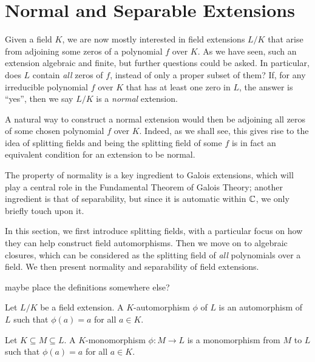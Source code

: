 \section{Normal and Separable Extensions}

Given a field $K$, we are now mostly interested in field extensions $L/K$ that arise from adjoining some zeros of a polynomial $f$ over $K$. As we have seen, such an extension algebraic and finite, but further questions could be asked. In particular, does $L$ contain \textit{all} zeros of $f$, instead of only a proper subset of them? If,  for any irreducible polynomial $f$ over $K$ that has at least one zero in $L$, the answer is ``yes'', then we say $L/K$ is a \textit{normal} extension. 

A natural way to construct a normal extension would then be adjoining all zeros of some chosen polynomial $f$ over $K$. Indeed, as we shall see, this gives rise to the idea of splitting fields and being the splitting field of some $f$ is in fact an equivalent condition for an extension to be normal. 

The property of normality is a key ingredient to Galois extensions, which will play a central role in the Fundamental Theorem of Galois Theory; another ingredient is that of separability, but since it is automatic within $\mathbb C$, we only briefly touch upon it. 

In this section, we first introduce splitting fields, with a particular focus on how they can help construct field automorphisms. Then we move on to algebraic closures, which can be considered as the splitting field of \textit{all} polynomials over a field. We then present normality and separability of field extensions. 



\TODO maybe place the definitions somewhere else?
\begin{definition} \label{def:automorphism}
	Let $L/K$ be a field extension. A $K$-automorphism $\phi$ of $L$ is an automorphism of $L$ such that $\phi(a) = a$ for all $a \in K$. 
\end{definition}

\begin{definition}
	Let $K \subseteq M \subseteq L$. A $K$-monomorphism $\phi : M \to L$ is a monomorphism from $M$ to $L$ such that $\phi(a) = a$ for all $a \in K$. 
\end{definition}

